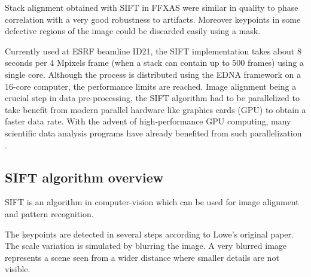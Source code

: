 \documentclass[preprint]{iucr}
\begin{document}
Stack alignment obtained with SIFT in FFXAS were similar in quality to phase
correlation with a very good robustness to artifacts.
Moreover keypoints in some defective regions of the image could be
discarded easily using a mask.

Currently used at ESRF beamline ID21, the SIFT implementation takes about 8
seconds per 4 Mpixels frame  (when a stack can contain up to  500 frames) using
a single core.
Although the process is distributed using the EDNA \cite{edna} framework on a 
16-core computer, the performance limits are reached.
Image alignment being a crucial step in data pre-processing, the SIFT
algorithm had to be parallelized to take benefit from modern parallel
hardware like graphics cards (GPU) to obtain a faster data rate.
With the advent of high-performance GPU computing, many scientific data analysis
programs have already benefited from such parallelization
\cite{pyhst2,pyfai,pynx}.

\subsection{SIFT algorithm overview}
SIFT is an algorithm in computer-vision which can be used for image alignment
and pattern recognition.  

The keypoints are detected in several steps according to Lowe's
original paper\cite{Lowe99}.
The scale variation is simulated by blurring the image.
A very blurred image represents a scene seen from a wider distance where
smaller details are not visible.
\end{document}
